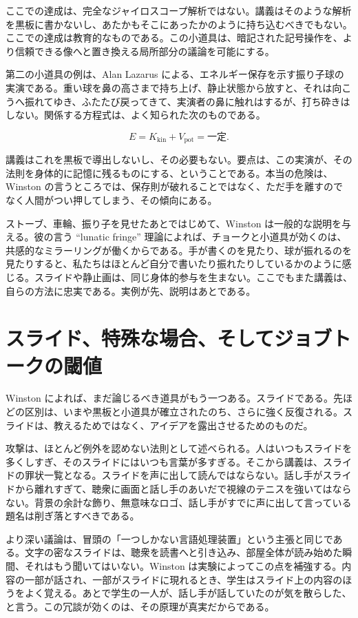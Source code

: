 ここでの達成は、完全なジャイロスコープ解析ではない。講義はそのような解析を黒板に書かないし、あたかもそこにあったかのように持ち込むべきでもない。ここでの達成は教育的なものである。この小道具は、暗記された記号操作を、より信頼できる像へと置き換える局所部分の議論を可能にする。

第二の小道具の例は、Alan Lazarus による、エネルギー保存を示す振り子球の実演である。重い球を鼻の高さまで持ち上げ、静止状態から放すと、それは向こうへ振れてゆき、ふたたび戻ってきて、実演者の鼻に触れはするが、打ち砕きはしない。関係する方程式は、よく知られた次のものである。

\begin{equation}
E = K_{\mathrm{kin}} + V_{\mathrm{pot}} = \text{一定}.
\end{equation}

講義はこれを黒板で導出しないし、その必要もない。要点は、この実演が、その法則を身体的に記憶に残るものにする、ということである。本当の危険は、Winston の言うところでは、保存則が破れることではなく、ただ手を離すのでなく人間がつい押してしまう、その傾向にある。

ストーブ、車輪、振り子を見せたあとではじめて、Winston は一般的な説明を与える。彼の言う ``lunatic fringe'' 理論によれば、チョークと小道具が効くのは、共感的なミラーリングが働くからである。手が書くのを見たり、球が振れるのを見たりすると、私たちはほとんど自分で書いたり振れたりしているかのように感じる。スライドや静止画は、同じ身体的参与を生まない。ここでもまた講義は、自らの方法に忠実である。実例が先、説明はあとである。

\section{スライド、特殊な場合、そしてジョブトークの閾値}

Winston によれば、まだ論じるべき道具がもう一つある。スライドである。先ほどの区別は、いまや黒板と小道具が確立されたのち、さらに強く反復される。スライドは、教えるためではなく、アイデアを露出させるためのものだ。

攻撃は、ほとんど例外を認めない法則として述べられる。人はいつもスライドを多くしすぎ、そのスライドにはいつも言葉が多すぎる。そこから講義は、スライドの罪状一覧となる。スライドを声に出して読んではならない。話し手がスライドから離れすぎて、聴衆に画面と話し手のあいだで視線のテニスを強いてはならない。背景の余計な飾り、無意味なロゴ、話し手がすでに声に出して言っている題名は削ぎ落とすべきである。

より深い議論は、冒頭の「一つしかない言語処理装置」という主張と同じである。文字の密なスライドは、聴衆を読書へと引き込み、部屋全体が読み始めた瞬間、それはもう聞いてはいない。Winston は実験によってこの点を補強する。内容の一部が話され、一部がスライドに現れるとき、学生はスライド上の内容のほうをよく覚える。あとで学生の一人が、話し手が話していたのが気を散らした、と言う。この冗談が効くのは、その原理が真実だからである。

